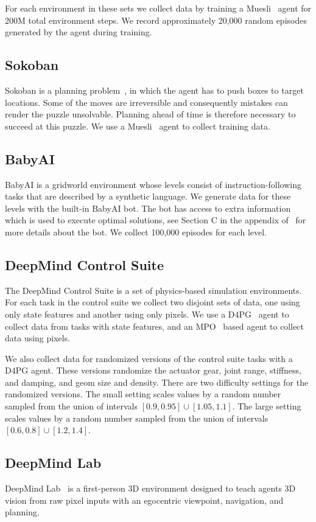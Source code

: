 \documentclass[10pt]{article} \usepackage[accepted]{tmlr}
\begin{document}
For each environment in these sets we collect data by training a Muesli~\citep{hessel2021muesli} agent for 200M total environment steps. We record approximately 20,000 random episodes generated by the agent during training.
\vskip 0.4cm
\subsection{Sokoban}
\vskip 0.2cm
Sokoban is a planning problem~\citep{racaniere2017imagination}, in which the agent has to push boxes to target
locations. Some of the moves are irreversible and consequently
mistakes can render the puzzle unsolvable. Planning ahead of time is therefore necessary to succeed at this puzzle.
We use a Muesli~\citep{hessel2021muesli} agent to collect training data.
\vskip 0.4cm
\subsection{BabyAI}
\vskip 0.2cm
BabyAI is a gridworld environment whose levels consist of instruction-following tasks that are described by a synthetic language. We generate data for these levels with the built-in BabyAI bot. 
The bot has access to extra information which is used to execute optimal solutions, see Section C in the appendix of~\citep{chevalier2018babyai} for more details about the bot. We collect 100,000 episodes for each level.
\vskip 0.4cm
\subsection{DeepMind Control Suite}
\vskip 0.2cm
The DeepMind Control Suite \citep{tunyasuvunakool2020dmcontrol, tassa2018deepmind} is a set of physics-based simulation environments. For each task in the control suite we collect two disjoint sets of data, one using only state features and another using only pixels.
We use a D4PG~\citep{barth2018distributed} agent to collect data from tasks with state features, and an MPO~\citep{abdolmaleki2018maximum} based agent to collect data using pixels.

We also collect data for randomized versions of the control suite tasks with a D4PG agent. These versions randomize the actuator gear, joint range, stiffness, and damping, and geom size and density.
There are two difficulty settings for the randomized versions. The small setting scales values by a random number sampled from the union of intervals $[0.9, 0.95] \cup [1.05, 1.1]$.
The large setting scales values by a random number sampled from the union of intervals $[0.6, 0.8] \cup [1.2, 1.4]$.
\vskip 0.4cm  \subsection{DeepMind Lab}
\vskip 0.2cm
DeepMind Lab~\citep{beattie2016deepmind} is a first-person 3D environment designed to teach agents
3D vision from raw pixel inputs with an egocentric viewpoint, navigation, and planning.
\end{document}
